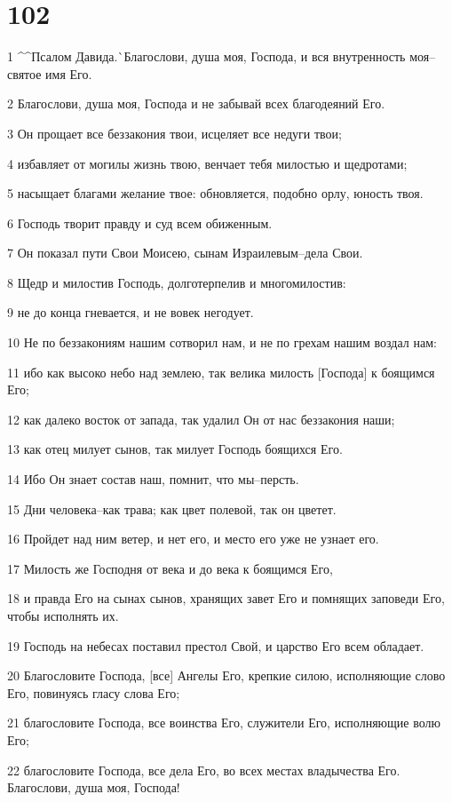 \chapter{102}

\par 1 ^^Псалом Давида.^^ Благослови, душа моя, Господа, и вся внутренность моя--святое имя Его.
\par 2 Благослови, душа моя, Господа и не забывай всех благодеяний Его.
\par 3 Он прощает все беззакония твои, исцеляет все недуги твои;
\par 4 избавляет от могилы жизнь твою, венчает тебя милостью и щедротами;
\par 5 насыщает благами желание твое: обновляется, подобно орлу, юность твоя.
\par 6 Господь творит правду и суд всем обиженным.
\par 7 Он показал пути Свои Моисею, сынам Израилевым--дела Свои.
\par 8 Щедр и милостив Господь, долготерпелив и многомилостив:
\par 9 не до конца гневается, и не вовек негодует.
\par 10 Не по беззакониям нашим сотворил нам, и не по грехам нашим воздал нам:
\par 11 ибо как высоко небо над землею, так велика милость [Господа] к боящимся Его;
\par 12 как далеко восток от запада, так удалил Он от нас беззакония наши;
\par 13 как отец милует сынов, так милует Господь боящихся Его.
\par 14 Ибо Он знает состав наш, помнит, что мы--персть.
\par 15 Дни человека--как трава; как цвет полевой, так он цветет.
\par 16 Пройдет над ним ветер, и нет его, и место его уже не узнает его.
\par 17 Милость же Господня от века и до века к боящимся Его,
\par 18 и правда Его на сынах сынов, хранящих завет Его и помнящих заповеди Его, чтобы исполнять их.
\par 19 Господь на небесах поставил престол Свой, и царство Его всем обладает.
\par 20 Благословите Господа, [все] Ангелы Его, крепкие силою, исполняющие слово Его, повинуясь гласу слова Его;
\par 21 благословите Господа, все воинства Его, служители Его, исполняющие волю Его;
\par 22 благословите Господа, все дела Его, во всех местах владычества Его. Благослови, душа моя, Господа!

